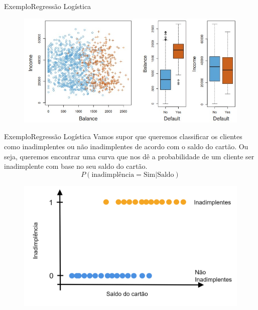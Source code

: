 \documentclass[t]{beamer}
\begin{document}

\begin{ftst}{Exemplo}{Regressão Logística}
\vone
\begin{figure}
    \centering
    \includegraphics[scale=0.5]{Figuras/slide05_04.jpg}
\end{figure}


\end{ftst}


\begin{ftst}{Exemplo}{Regressão Logística}
Vamos supor que queremos classificar os clientes como inadimplentes ou não inadimplentes de acordo com o saldo do cartão.
\vone
Ou seja, queremos encontrar uma curva que nos dê a probabilidade de um cliente ser inadimplente com base no seu saldo do cartão.
\begin{equation}
    P(\text{inadimplência}=\text{Sim} | \text{Saldo})
\end{equation}

\begin{figure}
    \centering
    \includegraphics[scale=0.125]{Figuras/slide05_05.png}
\end{figure}


\end{ftst}
\end{document}
